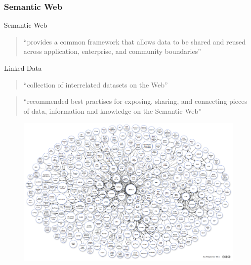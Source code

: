 \documentclass{beamer}
\begin{document}
\begin{frame}
\frametitle{Semantic Web}

\begin{block}{Semantic Web}
  \begin{quote}
    ``provides a common framework that allows data to be shared and reused across application, enterprise, and community
    boundaries''
  \end{quote}
\end{block}
\pause
\begin{block}{Linked Data}
  \begin{quote}
  ``collection of interrelated datasets on the Web''
  \end{quote}
  \begin{quote}
  ``recommended best practises for exposing, sharing, and connecting pieces of data, information and knowledge on the
Semantic Web''
  \end{quote}
\end{block}
\end{frame}
\begin{frame}
  \begin{figure}
  \includegraphics[width=1\linewidth]{./Figures/lod-datasets_2011-09-19}
  \end{figure}
\end{frame}
\end{document}
